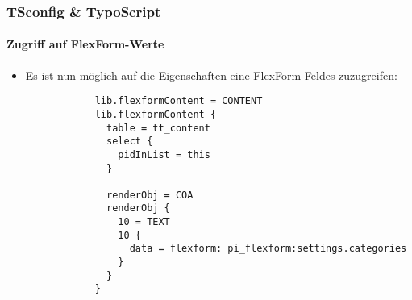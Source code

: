 \begin{frame}[fragile]
	\frametitle{TSconfig \& TypoScript}
	\framesubtitle{Zugriff auf FlexForm-Werte}

	\lstset{basicstyle=\tiny\ttfamily}

	\begin{itemize}

		\item Es ist nun möglich auf die Eigenschaften eine  FlexForm-Feldes zuzugreifen:

		\begin{lstlisting}
			lib.flexformContent = CONTENT
			lib.flexformContent {
			  table = tt_content
			  select {
			    pidInList = this
			  }

			  renderObj = COA
			  renderObj {
			    10 = TEXT
			    10 {
			      data = flexform: pi_flexform:settings.categories
			    }
			  }
			}
		\end{lstlisting}

	\end{itemize}

\end{frame}

